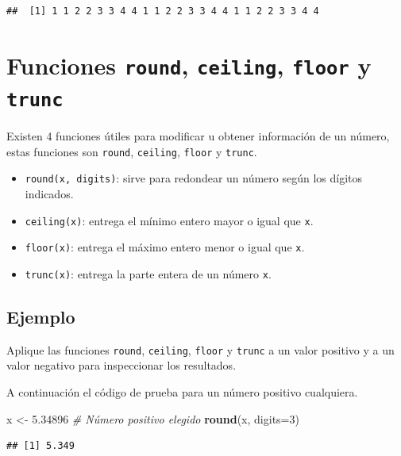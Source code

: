 \documentclass[10pt,]{krantz}
\makeatletter
\newenvironment{Shaded}{\begin{snugshade}}{\end{snugshade}}
\newcommand{\KeywordTok}[1]{\textcolor[rgb]{0.13,0.29,0.53}{\textbf{#1}}}
\newcommand{\DataTypeTok}[1]{\textcolor[rgb]{0.13,0.29,0.53}{#1}}
\newcommand{\DecValTok}[1]{\textcolor[rgb]{0.00,0.00,0.81}{#1}}
\newcommand{\FloatTok}[1]{\textcolor[rgb]{0.00,0.00,0.81}{#1}}
\newcommand{\StringTok}[1]{\textcolor[rgb]{0.31,0.60,0.02}{#1}}
\newcommand{\CommentTok}[1]{\textcolor[rgb]{0.56,0.35,0.01}{\textit{#1}}}
\newcommand{\NormalTok}[1]{#1}
\providecommand{\tightlist}{%
  \setlength{\itemsep}{0pt}\setlength{\parskip}{0pt}}
\newenvironment{kframe}{%
\medskip{}
\setlength{\fboxsep}{.8em}
 \def\at@end@of@kframe{}%
 \ifinner\ifhmode%
  \def\at@end@of@kframe{\end{minipage}}%
  \begin{minipage}{\columnwidth}%
 \fi\fi%
 \def\FrameCommand##1{\hskip\@totalleftmargin \hskip-\fboxsep
 \colorbox{shadecolor}{##1}\hskip-\fboxsep
     \hskip-\linewidth \hskip-\@totalleftmargin \hskip\columnwidth}%
 \MakeFramed {\advance\hsize-\width
   \@totalleftmargin\z@ \linewidth\hsize
   \@setminipage}}%
 {\par\unskip\endMakeFramed%
 \at@end@of@kframe}
\renewenvironment{Shaded}{\begin{kframe}}{\end{kframe}}
\makeatother
\begin{document}
\begin{verbatim}
##  [1] 1 1 2 2 3 3 4 4 1 1 2 2 3 3 4 4 1 1 2 2 3 3 4 4
\end{verbatim}

\section{\texorpdfstring{Funciones \texttt{round}, \texttt{ceiling},
\texttt{floor} y \texttt{trunc}  
}{Funciones round, ceiling, floor y trunc    }}\label{funciones-round-ceiling-floor-y-trunc}

Existen 4 funciones útiles para modificar u obtener información de un
número, estas funciones son \texttt{round}, \texttt{ceiling},
\texttt{floor} y \texttt{trunc}.

\begin{itemize}
\tightlist
\item
  \texttt{round(x,\ digits)}: sirve para redondear un número según los
  dígitos indicados.
\item
  \texttt{ceiling(x)}: entrega el mínimo entero mayor o igual que
  \texttt{x}.
\item
  \texttt{floor(x)}: entrega el máximo entero menor o igual que
  \texttt{x}.
\item
  \texttt{trunc(x)}: entrega la parte entera de un número \texttt{x}.
\end{itemize}

\subsection*{Ejemplo}\label{ejemplo-13}


Aplique las funciones \texttt{round}, \texttt{ceiling}, \texttt{floor} y
\texttt{trunc} a un valor positivo y a un valor negativo para
inspeccionar los resultados.

A continuación el código de prueba para un número positivo cualquiera.

\begin{Shaded}
\begin{Highlighting}[]
\NormalTok{x <-}\StringTok{ }\FloatTok{5.34896}  \CommentTok{# Número positivo elegido}
\KeywordTok{round}\NormalTok{(x, }\DataTypeTok{digits=}\DecValTok{3}\NormalTok{)}
\end{Highlighting}
\end{Shaded}

\begin{verbatim}
## [1] 5.349
\end{verbatim}
\end{document}
